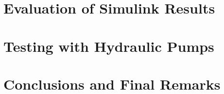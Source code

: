 \documentclass{LTHthesis}
\begin{document}
\chapter{Evaluation of Simulink Results}

\chapter{Testing with Hydraulic Pumps}


\chapter{Conclusions and Final Remarks}


\cite{pyr2009} %



\printbibliography  %
\end{document}
